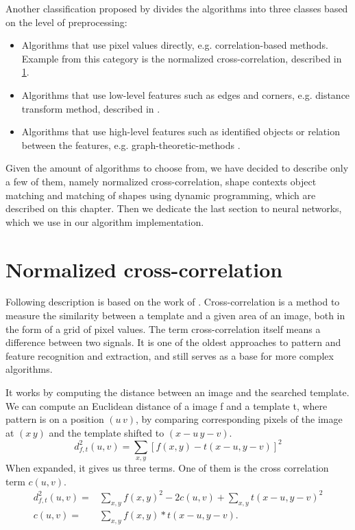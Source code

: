 Another classification proposed by \citet{distanceTransform} divides the algorithms into three classes based on the level of preprocessing:
\begin{itemize}
\item Algorithms that use pixel values directly, e.g. correlation-based methods. Example from this category is the normalized cross-correlation, described in \cref{normalizedCC}.
\item Algorithms that use low-level features such as edges and corners, e.g. distance transform method, described in \citet{distanceTransform}.
\item Algorithms that use high-level features such as identified objects or relation between the features, e.g. graph-theoretic-methods \cite{graph}.
\end{itemize}

Given the amount of algorithms to choose from, we have decided to describe only a few of them, namely normalized cross-correlation, shape contexts object matching and matching of shapes using dynamic programming, which are described on this chapter. Then we dedicate the last section to neural networks, which we use in our algorithm implementation.

\section{Normalized cross-correlation}
\label{normalizedCC}
Following description is based on the work of \cite{crossCorrLewis}.
Cross-correlation is a method to measure the similarity between a template and a given area of an image, both in the form of a grid of pixel values. The term cross-correlation itself means a difference between two signals. It is one of the oldest approaches to pattern and feature recognition and extraction, and still serves as a base for more complex algorithms.

It works by computing the distance between an image and the searched template. We can compute an Euclidean distance of a image f and a template t, where pattern is on a position $(u\,v)$, by comparing corresponding pixels of the image at $(x\,y)$ and the template shifted to $(x-u\,y-v)$.
\[d_{f,t}^{2}(u,v)=\sum_{x,y} [ f(x,y) - t(x-u, y-v) ]^{2}\]
When expanded, it gives us three terms. One of them is the cross correlation term $c(u,v)$.
\begin{align*}
d_{f,t}^{2}(u,v)=&\sum_{x,y} f(x,y)^{2} - 2c(u,v) + \sum_{x,y} t(x-u, y-v)^2 \\
c(u,v)=&\sum_{x,y} f(x,y) * t(x-u, y-v).
\end{align*}

